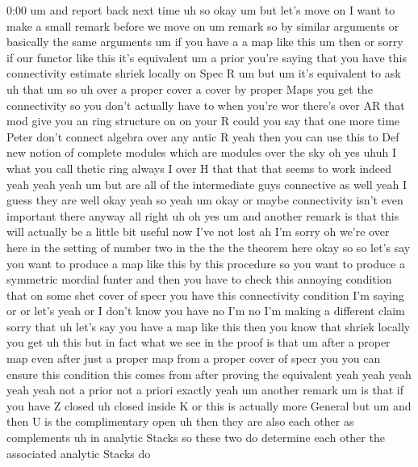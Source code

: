 \begin{unfinished}{0:00}
um  and  report  back  next  time  uh  so  okay
um  but  let's  move  on  I  want  to  make  a
small  remark  before  we  move  on
um  remark  so  by  similar  arguments  or
basically  the  same
arguments
um  if  you  have  a  a  map  like  this  um  then
or  sorry  if  our  functor  like  this  it's
equivalent  um  a  prior  you're  saying  that
you  have  this  connectivity  estimate
shriek  locally  on  Spec  R  um  but  um  it's
equivalent  to
ask  uh
that
um
so  uh  over  a  proper  cover  a  cover  by
proper
Maps  you  get  the
connectivity  so  you  don't  actually  have
to  when  you're  wor
there's  over  AR  that  mod  give  you  an
ring
structure  on  on  your  R  could  you  say
that  one  more  time
Peter
don't  connect  algebra  over  any  antic  R
yeah  then  you  can  use  this  to  Def  new
notion  of  complete  modules  which  are
modules  over  the  sky  oh  yes  uhuh  I  what
you  call  thetic  ring
always  I
over  H  that  that  that  seems  to  work
indeed  yeah
yeah
yeah  um  but  are  all  of  the  intermediate
guys  connective  as  well  yeah  I  guess
they  are  well  okay  yeah  so
yeah  um  okay  or  maybe  connectivity  isn't
even  important  there  anyway  all  right  uh
oh  yes  um  and  another  remark  is  that
this  will  actually  be  a  little  bit
useful  now  I've  not  lost  ah  I'm  sorry  oh
we're  over  here  in  the  setting  of  number
two  in  the  the  the  theorem  here  okay  so
so  let's  say  you  want  to  produce  a  map
like  this  by  this  procedure  so  you  want
to  produce  a  symmetric  mordial  funter
and  then  you  have  to  check  this  annoying
condition  that  on  some  shet  cover  of
specr  you  have  this  connectivity
condition  I'm  saying  or  or  let's  yeah  or
I  don't  know  you  have  no  I'm  no  I'm
making  a  different  claim  sorry  that  uh
let's  say  you  have  a  map  like  this  then
you  know  that  shriek  locally  you  get  uh
this  but  in  fact  what  we  see  in  the
proof  is  that  um  after  a  proper  map  even
after  just  a  proper  map  from  a  proper
cover  of  specr  you  you  can  ensure  this
condition  this  comes  from  after  proving
the  equivalent  yeah  yeah  yeah  yeah  yeah
not  a  prior  not  a  priori  exactly
yeah  um  another  remark  um  is  that  if  you
have  Z
closed  uh  closed  inside  K  or  this  is
actually  more  General  but  um  and  then  U
is  the  complimentary
open  uh  then  they  are  also  each  other  as
complements  uh  in  analytic
Stacks  so  these  two  do  determine  each
other  the  associated  analytic  Stacks  do

\end{unfinished}
